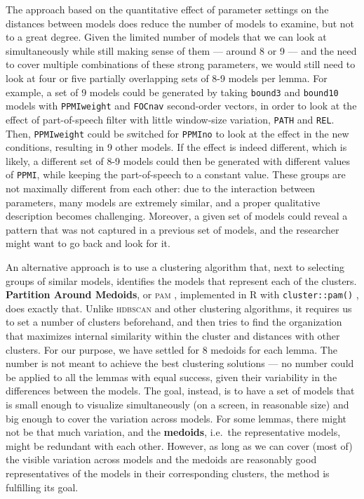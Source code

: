 \documentclass[
]{book}
\begin{document}
The approach based on the quantitative effect of parameter settings on the distances between models does reduce the number of models to examine, but not to a great degree. Given the limited number of models that we can look at simultaneously while still making sense of them --- around 8 or 9 --- and the need to cover multiple combinations of these strong parameters, we would still need to look at four or five partially overlapping sets of 8-9 models per lemma. For example, a set of 9 models could be generated by taking \texttt{bound3} and \texttt{bound10} models with \texttt{PPMIweight} and \texttt{FOCnav} second-order vectors, in order to look at the effect of part-of-speech filter with little window-size variation, \texttt{PATH} and \texttt{REL}. Then, \texttt{PPMIweight} could be switched for \texttt{PPMIno} to look at the effect in the new conditions, resulting in 9 other models. If the effect is indeed different, which is likely, a different set of 8-9 models could then be generated with different values of \texttt{PPMI}, while keeping the part-of-speech to a constant value. These groups are not maximally different from each other: due to the interaction between parameters, many models are extremely similar, and a proper qualitative description becomes challenging. Moreover, a given set of models could reveal a pattern that was not captured in a previous set of models, and the researcher might want to go back and look for it.

An alternative approach is to use a clustering algorithm that, next to selecting groups of similar models, identifies the models that represent each of the clusters. \textbf{Partition Around Medoids}, or \textsc{pam} \autocite{kaufman.rousseeuw_1990}, implemented in R with \texttt{cluster::pam()} \autocite{R-cluster}, does exactly that. Unlike \textsc{hdbscan} and other clustering algorithms, it requires us to set a number of clusters beforehand, and then tries to find the organization that maximizes internal similarity within the cluster and distances with other clusters.
For our purpose, we have settled for 8 medoids for each lemma. The number is not meant to achieve the best clustering solutions --- no number could be applied to all the lemmas with equal success, given their variability in the differences between the models. The goal, instead, is to have a set of models that is small enough to visualize simultaneously (on a screen, in reasonable size) and big enough to cover the variation across models. For some lemmas, there might not be that much variation, and the \textbf{medoids}, i.e.~the representative models, might be redundant with each other. However, as long as we can cover (most of) the visible variation across models and the medoids are reasonably good representatives of the models in their corresponding clusters, the method is fulfilling its goal.
\end{document}
